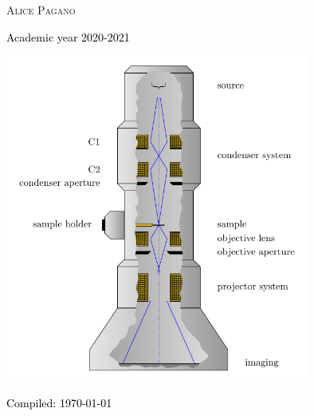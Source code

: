 \begin{titlepage}
	\textsc{ \Large Alice Pagano \\} %
	
	\vspace{0.5\baselineskip} %
	
	
	\vspace{0.5\baselineskip}
	
	\textcolor{black}{\small Academic year 2020-2021}
	
	\vspace{1cm}
	
	\includegraphics[width=10cm]{../frontespizio/3.pdf}
	
	\vspace{1cm}
		
	\textcolor{black}{\footnotesize Compiled: \today} %
	

\end{titlepage}

\clearpage{\pagestyle{empty}\cleardoublepage}












